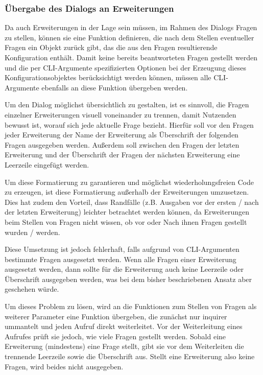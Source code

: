 \subsubsection{Übergabe des Dialogs an Erweiterungen}
\label{impl:extension_questions}

Da auch Erweiterungen in der Lage sein müssen, im Rahmen des Dialogs Fragen zu stellen, können sie eine Funktion definieren, die nach dem Stellen eventueller Fragen ein Objekt zurück gibt, das die aus den Fragen resultierende Konfiguration enthält. Damit keine bereits beantworteten Fragen gestellt werden und die per \gls{CLI}-Argumente spezifizierten Optionen bei der Erzeugung dieses Konfigurationsobjektes berücksichtigt werden können, müssen alle \gls{CLI}-Argumente ebenfalls an diese Funktion übergeben werden.

Um den Dialog möglichst übersichtlich zu gestalten, ist es sinnvoll, die Fragen einzelner Erweiterungen visuell voneinander zu trennen, damit Nutzenden bewusst ist, worauf sich jede aktuelle Frage bezieht. Hierfür soll vor den Fragen jeder Erweiterung der Name der Erweiterung als Überschrift der folgenden Fragen ausgegeben werden. Außerdem soll zwischen den Fragen der letzten Erweiterung und der Überschrift der Fragen der nächsten Erweiterung eine Leerzeile eingefügt werden.

Um diese Formatierung zu garantieren und möglichst wiederholungsfreien Code zu erzeugen, ist diese Formatierung außerhalb der Erweiterungen umzusetzen. Dies hat zudem den Vorteil, dass Randfälle (z.B. Ausgaben vor der ersten / nach der letzten Erweiterung) leichter betrachtet werden können, da Erweiterungen beim Stellen von Fragen nicht wissen, ob vor oder Nach ihnen Fragen gestellt wurden / werden.

Diese Umsetzung ist jedoch fehlerhaft, falls aufgrund von \gls{CLI}-Argumenten bestimmte Fragen ausgesetzt werden. Wenn alle Fragen einer Erweiterung ausgesetzt werden, dann sollte für die Erweiterung auch keine Leerzeile oder Überschrift ausgegeben werden, was bei dem bisher beschriebenen Ansatz aber geschehen würde.

Um dieses Problem zu lösen, wird an die Funktionen zum Stellen von Fragen als weiterer Parameter eine Funktion übergeben, die zunächst nur inquirer ummantelt und jeden Aufruf direkt weiterleitet. Vor der Weiterleitung eines Aufrufes prüft sie jedoch, wie viele Fragen gestellt werden. Sobald eine Erweiterung (mindestens) eine Frage stellt, gibt sie vor dem Weiterleiten die trennende Leerzeile sowie die Überschrift aus. Stellt eine Erweiterung also keine Fragen, wird beides nicht ausgegeben.

